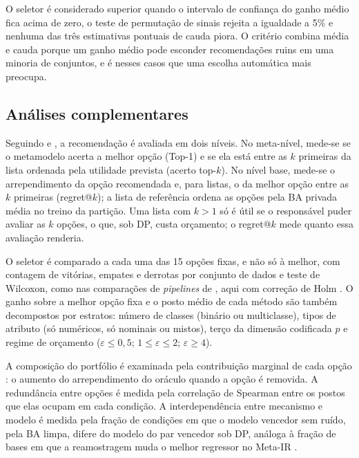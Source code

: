 O seletor é considerado superior quando o intervalo de confiança do ganho médio fica acima de zero, o teste de permutação de sinais rejeita a igualdade a 5\% e nenhuma das três estimativas pontuais de cauda piora. O critério combina média e cauda porque um ganho médio pode esconder recomendações ruins em uma minoria de conjuntos, e é nesses casos que uma escolha automática mais preocupa.

\subsection{Análises complementares}
\label{sec:analises-complementares}

Seguindo  e , a recomendação é avaliada em dois níveis. No meta-nível, mede-se se o metamodelo acerta a melhor opção (Top-1) e se ela está entre as $k$ primeiras da lista ordenada pela utilidade prevista (acerto top-$k$). No nível base, mede-se o arrependimento da opção recomendada e, para listas, o da melhor opção entre as $k$ primeiras (regret@$k$); a lista de referência ordena as opções pela BA privada média no treino da partição. Uma lista com $k > 1$ só é útil se o responsável puder avaliar as $k$ opções, o que, sob DP, custa orçamento; o regret@$k$ mede quanto essa avaliação renderia.

O seletor é comparado a cada uma das 15 opções fixas, e não só à melhor, com contagem de vitórias, empates e derrotas por conjunto de dados e teste de Wilcoxon, como nas comparações de \textit{pipelines} de , aqui com correção de Holm \cite{ref93}. O ganho sobre a melhor opção fixa e o posto médio de cada método são também decompostos por estratos: número de classes (binário ou multiclasse), tipos de atributo (só numéricos, só nominais ou mistos), terço da dimensão codificada $p$ e regime de orçamento ($\varepsilon \le 0{,}5$; $1 \le \varepsilon \le 2$; $\varepsilon \ge 4$).

A composição do portfólio é examinada pela contribuição marginal de cada opção \cite{ref78}: o aumento do arrependimento do oráculo quando a opção é removida. A redundância entre opções é medida pela correlação de Spearman entre os postos que elas ocupam em cada condição. A interdependência entre mecanismo e modelo é medida pela fração de condições em que o modelo vencedor sem ruído, pela BA limpa, difere do modelo do par vencedor sob DP, análoga à fração de bases em que a reamostragem muda o melhor regressor no Meta-IR \cite{ref73}.

